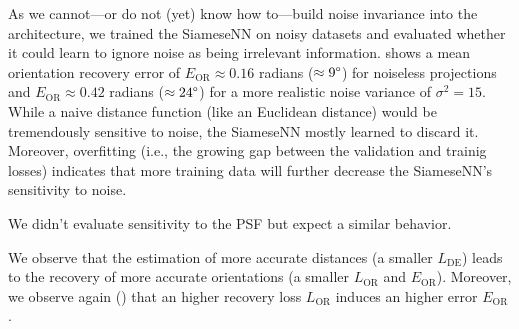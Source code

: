 As we cannot---or do not (yet) know how to---build noise invariance into the architecture, we trained the SiameseNN on noisy datasets and evaluated whether it could learn to ignore noise as being irrelevant information.
 shows a mean orientation recovery error of $E_\text{OR} \approx 0.16$ radians ($\approx 9\degree$) for noiseless projections and $E_\text{OR} \approx 0.42$ radians ($\approx 24\degree$) for a more realistic noise variance of $\sigma^2=15$.
While a naive distance function (like an Euclidean distance) would be tremendously sensitive to noise, the SiameseNN mostly learned to discard it.
Moreover, overfitting (i.e., the growing gap between the validation and trainig losses) indicates that more training data will further decrease the SiameseNN's sensitivity to noise.

We didn't evaluate sensitivity to the PSF but expect a similar behavior.

We observe that the estimation of more accurate distances (a smaller $L_\text{DE}$) leads to the recovery of more accurate orientations (a smaller $L_\text{OR}$ and $E_\text{OR}$).
Moreover, we observe again () that an higher recovery loss $L_\text{OR}$ induces an higher error $E_\text{OR}$.


